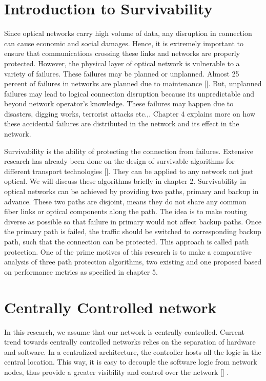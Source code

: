 \section{Introduction to Survivability}

Since optical networks carry high volume of data, any disruption in connection can cause economic and social damages. Hence, it is extremely important to ensure that communications crossing these links and networks are properly protected. However, the physical layer of optical network is vulnerable to a variety of failures. These failures may be planned or unplanned. Almost 25 percent of failures in networks are planned due to maintenance []. But, unplanned failures may lead to logical connection disruption because its unpredictable and beyond network operator's knowledge. These failures may happen due to disasters, digging works, terrorist attacks etc.,. Chapter 4 explains more on how these accidental failures are distributed in the network and its effect in the network. 

Survivability is the ability of protecting the connection from failures. Extensive research has already been done on the design of survivable algorithms for different transport technologies []. They can be applied to any network not just optical. We will discuss these algorithms briefly in chapter 2. Survivability in optical networks can be achieved by providing two paths, primary and backup in advance. These two paths are disjoint, means they do not share any common fiber links or optical components along the path. The idea is to make routing diverse as possible so that failure in primary would not affect backup paths. Once the primary path is failed, the traffic should be switched to corresponding backup path, such that the connection can be protected. This approach is called path protection. One of the prime motives of this research is to make a comparative analysis of three path protection algorithms, two existing and one proposed based on performance metrics as specified in chapter 5.

\section{Centrally Controlled network}

In this research, we assume that our network is centrally controlled. Current trend towards centrally controlled networks relies on the separation of hardware and software. In a centralized architecture, the controller hosts all the logic in the central location. This way, it is easy to decouple the software logic from network nodes, thus provide a greater visibility and control over the network [] .

